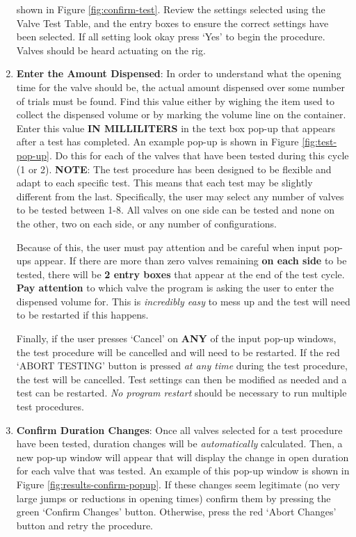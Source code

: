 \documentclass{article}
\begin{document}
\begin{enumerate}
        shown in Figure \ref{fig:confirm-test}. Review the settings selected using the Valve Test Table, and the entry boxes to ensure the 
        correct settings have been selected. If all setting look okay press `Yes' to begin the procedure. Valves should be heard actuating
        on the rig. 
    \item \textbf{Enter the Amount Dispensed}: In order to understand what the opening time for the valve should be, the actual amount dispensed
        over some number of trials must be found. Find this value either by wighing the item used to collect the dispensed volume or by 
        marking the volume line on the container. Enter this value \textbf{IN MILLILITERS} in the text box pop-up that appears after a test 
        has completed. An example pop-up is shown in Figure \ref{fig:test-pop-up}. Do this for each of the valves that have been tested 
        during this cycle (1 or 2).
        \newline
        \newline
        \textbf{NOTE}: The test procedure has been designed to be flexible and adapt to each specific test. This means that each test may 
        be slightly different from the last. Specifically, the user may select any number of valves to be tested between 1-8. All valves on 
        one side can be tested and none on the other, two on each side, or any number of configurations. 

        Because of this, the user must 
        pay attention and be careful when input pop-ups appear. If there are more than zero valves remaining \textbf{on each side} to be tested,
        there will be \textbf{2 entry boxes} that appear at the end of the test cycle. \textbf{Pay attention} to which valve the program is
        asking the user to enter the dispensed volume for. This is \textit{incredibly easy} to mess up and the test will need to be restarted if 
        this happens. 

        Finally, if the user presses `Cancel' on \textbf{ANY} of the input pop-up windows, the test procedure will be cancelled and will need
        to be restarted. If the red `ABORT TESTING' button is pressed \textit{at any time} during the test procedure, the test will be 
        cancelled. Test settings can then be modified as needed and a test can be restarted. \textit{No program restart} should be necessary 
        to run multiple test procedures.
    \item \textbf{Confirm Duration Changes}: Once all valves selected for a test procedure have been tested, duration changes will be 
        \textit{automatically} calculated. Then, a new pop-up window will appear that will display the change in open duration for each
        valve that was tested. An example of this pop-up window is shown in Figure \ref{fig:results-confirm-popup}. If these changes 
        seem legitimate (no very large jumps or reductions in opening times) confirm them by pressing the green `Confirm Changes' button. 
        Otherwise, press the red `Abort Changes' button and retry the procedure.
\end{enumerate}
\end{document}
